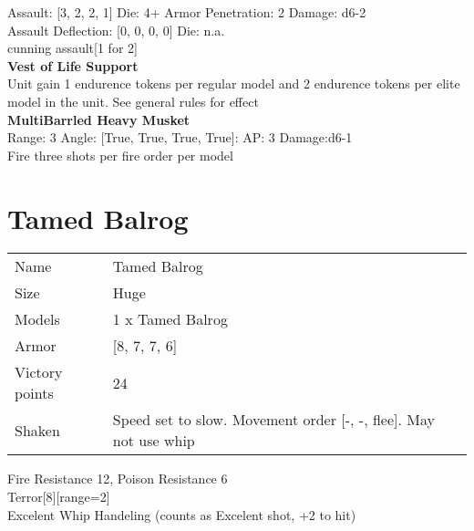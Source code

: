 Assault: [3, 2, 2, 1] Die: 4+ Armor Penetration: 2 Damage: d6-2 \\
Assault Deflection: [0, 0, 0, 0] Die: n.a.\\
\indent cunning assault[1 for 2]\\ 
 



{\bf Vest of Life Support } \\

Unit gain 1 endurence tokens per regular model  and 2 endurence tokens per elite model in the unit. See general rules for effect\\ 





{\bf MultiBarrled Heavy Musket } \\



Range: 3  Angle: [True, True, True, True]: AP: 3 Damage:d6-1 \\
Fire three shots per fire order per model\\ 




 















\pagebreak\pagebreak

\section{ Tamed Balrog }

\begin{tabular}{ll}
  Name & Tamed Balrog \\
  Size & Huge\\
  Models & 1 x Tamed Balrog\\
  Armor & [8, 7, 7, 6]\\
  Victory points & 24\\
  Shaken & Speed set to slow. Movement order [-, -, flee]. May not use whip\\
\end{tabular}

Fire Resistance 12, Poison Resistance 6\\ 
Terror[8][range=2]\\ 
Excelent Whip Handeling (counts as Excelent shot, +2 to hit)\\ 



